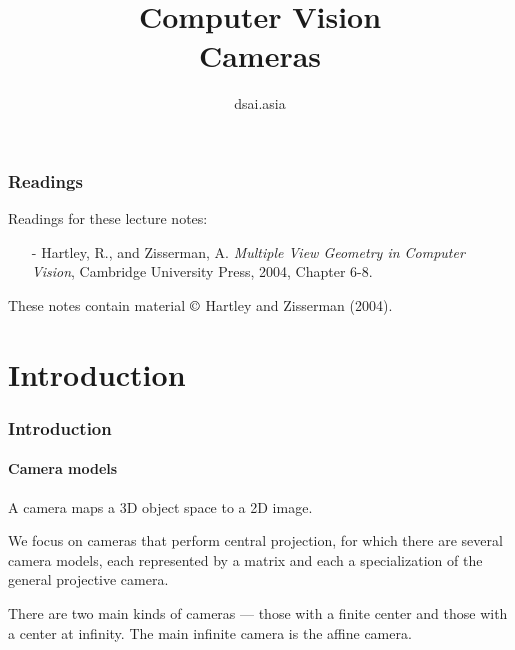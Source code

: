 \documentclass[aspectratio=169]{beamer}
\title[Computer Vision]{Computer Vision\\Cameras}
\author{dsai.asia}
\institute[]{Asia Data Science and Artificial Intelligence Master's Program}
\date{}
\begin{document}


\frame{\titlepage}

%

\begin{frame}
\frametitle{Readings}

Readings for these lecture notes:
\begin{itemize}
\item[-] Hartley, R., and Zisserman, A. {\em Multiple View Geometry in
    Computer Vision}, Cambridge University Press, 2004, Chapter 6-8.
\end{itemize}

These notes contain material $\copyright$ Hartley and Zisserman
(2004).

\end{frame}

\section{Introduction}

\begin{frame}
\frametitle{Introduction}
\framesubtitle{Camera models}

A \alert{camera} maps a 3D \alert{object space} to a 2D \alert{image}.

\medskip

We focus on cameras that perform \alert{central projection}, for which
there are several \alert{camera models}, each represented by a matrix
and each a specialization of the \alert{general projective camera}.

\medskip

There are two main kinds of cameras --- those with a \alert{finite center}
and those with a center \alert{at infinity}.  The main infinite camera
is the \alert{affine camera}.

\end{frame}

\end{document}
